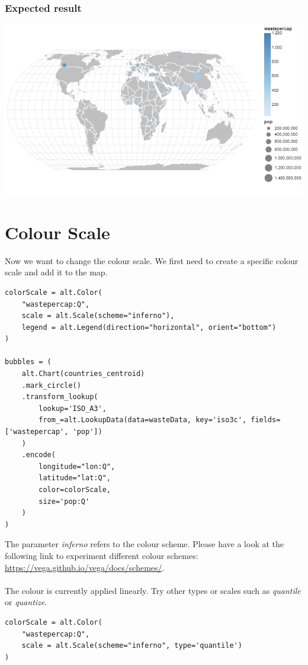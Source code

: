 \documentclass[11pt]{article}
\begin{document}
\subsubsection*{Expected result}

\begin{center}
\includegraphics[width=.6\textwidth]{visualization (6).png}
\end{center}

\section{Colour Scale}

Now we want to change the colour scale. We first need to create a specific colour scale and add it to the map.

\begin{verbatim}
colorScale = alt.Color(
    "wastepercap:Q",
    scale = alt.Scale(scheme="inferno"),
    legend = alt.Legend(direction="horizontal", orient="bottom")
)

bubbles = (
    alt.Chart(countries_centroid)
    .mark_circle()
    .transform_lookup(
        lookup='ISO_A3',
        from_=alt.LookupData(data=wasteData, key='iso3c', fields=['wastepercap', 'pop'])
    )
    .encode(
        longitude="lon:Q",
        latitude="lat:Q",
        color=colorScale,
        size='pop:Q'
    )
)
\end{verbatim}

The parameter \textit{inferno} refers to the colour scheme. Please have a look at the following link to experiment different colour schemes: \url{https://vega.github.io/vega/docs/schemes/}.\\
\\
The colour is currently applied linearly. Try other types or scales such as \textit{quantile} or \textit{quantize}.

\begin{verbatim}
colorScale = alt.Color(
    "wastepercap:Q",
    scale = alt.Scale(scheme="inferno", type='quantile')
)
\end{verbatim}
\end{document}
